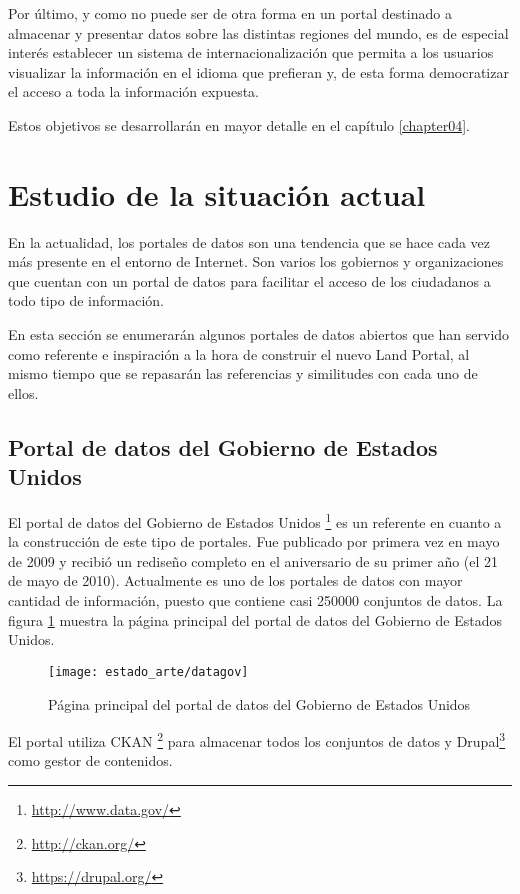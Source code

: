 {Por último, y como no puede ser de otra forma en un portal destinado a almacenar y presentar datos sobre las distintas regiones del mundo, es de especial interés establecer un sistema de internacionalización que permita a los usuarios visualizar la información en el idioma que prefieran y, de esta forma democratizar el acceso a toda la información expuesta.

Estos objetivos se desarrollarán en mayor detalle en el capítulo \ref{chapter04}.



\section{Estudio de la situación actual}
\label{estudio_situacion_actual}
En la actualidad, los portales de datos son una tendencia que se hace cada vez más presente en el entorno de Internet.  Son varios los gobiernos y organizaciones que cuentan con un portal de datos para facilitar el acceso de los ciudadanos a todo tipo de información.

En esta sección se enumerarán algunos portales de datos abiertos que han servido como referente e inspiración a la hora de construir el nuevo Land Portal, al mismo tiempo que se repasarán las referencias y similitudes con cada uno de ellos.

\subsection{Portal de datos del Gobierno de Estados Unidos}
El portal de datos del Gobierno de Estados Unidos \footnote{\url{http://www.data.gov/}} es un referente en cuanto a la construcción de este tipo de portales.  Fue publicado por primera vez en mayo de 2009 y recibió un rediseño completo en el aniversario de su primer año (el 21 de mayo de 2010).  Actualmente es uno de los portales de datos con mayor cantidad de información, puesto que contiene casi 250000 conjuntos de datos.  La figura \ref{fig:estado_arte_datagov} muestra la página principal del portal de datos del Gobierno de Estados Unidos.
\begin{figure}[h]
\centering
\texttt{[image: estado\_arte/datagov]}
\caption{Página principal del portal de datos del Gobierno de Estados Unidos}
\label{fig:estado_arte_datagov}
\end{figure}

El portal utiliza CKAN \footnote{\url{http://ckan.org/}} para almacenar todos los conjuntos de datos y Drupal\footnote{\url{https://drupal.org/}} como gestor de contenidos.

}
